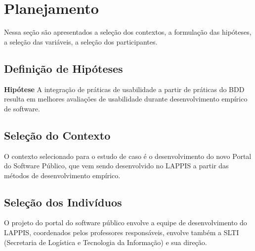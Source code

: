 \section{Planejamento}

Nessa seção são apresentados a seleção dos contextos, a formulação das hipóteses, a seleção das variáveis, a seleção dos participantes.

\subsection{Definição de Hipóteses}

\textbf{Hipótese}  A integração de práticas de usabilidade a partir de práticas do BDD resulta em melhores avaliações de usabilidade durante desenvolvimento empírico de software.




\subsection{Seleção do Contexto}

O contexto selecionado para o estudo de caso é o desenvolvimento do novo Portal do Software Público, que vem sendo desenvolvido no LAPPIS a partir das métodos de desenvolvimento empírico.		


\subsection{Seleção dos Indivíduos}

O projeto do portal do software público envolve a equipe de desenvolvimento do LAPPIS, coordenados pelos professores responsáveis, envolve também a SLTI (Secretaria de Logística e Tecnologia da Informação) e sua direção.

